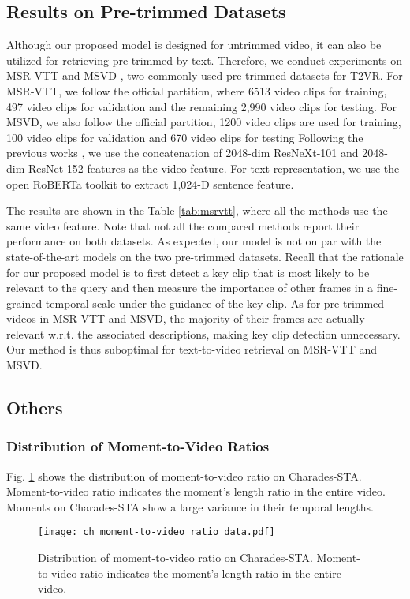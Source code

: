 \documentclass[sigconf]{acmart}
\begin{document}
\subsection{Results on Pre-trimmed Datasets}\label{sec:pre-trimmed}
Although our proposed model is designed for untrimmed video, it can also be utilized for retrieving pre-trimmed by text. Therefore, we conduct experiments on MSR-VTT \cite{xu2016msr} and MSVD \cite{chen2011collecting}, two commonly used pre-trimmed datasets for T2VR.
For MSR-VTT, we follow the official partition, where 6513 video clips for training, 497 video clips for validation and the remaining 2,990 video clips for testing. For MSVD, we also follow the official partition, 1200 video clips are used for training, 100 video clips for validation and 670 video clips for testing
Following the previous works \cite{dong2021dual,dong2022reading,li2019w2vv++}, we use the concatenation of 2048-dim ResNeXt-101 and 2048-dim ResNet-152 features as the video feature. For text representation, we use the open RoBERTa toolkit to extract 1,024-D sentence feature.  


The results are shown in the Table \ref{tab:msrvtt}, where all the methods use the same video feature. Note that not all the compared methods report their performance on both datasets. As expected, our model is not on par with the state-of-the-art models on the two pre-trimmed datasets. Recall that the rationale for our proposed model is to first detect a key clip that is most likely to be relevant to the query and then measure the importance of other frames in a fine-grained temporal scale under the guidance of the key clip. As for pre-trimmed videos in MSR-VTT and MSVD, the majority of their frames are actually relevant w.r.t. the associated descriptions, making key clip detection unnecessary. Our method is thus suboptimal for text-to-video retrieval on MSR-VTT and MSVD.





\subsection{Others}
\subsubsection{Distribution of Moment-to-Video Ratios}\label{sec:mvr}
Fig. \ref{fig:ratio_distribution_appendix} shows the distribution of moment-to-video ratio on Charades-STA. Moment-to-video ratio indicates the moment’s length ratio in the entire video.
Moments on Charades-STA show a large variance in their temporal lengths.
\begin{figure}[htb]
\texttt{[image: ch\_moment-to-video\_ratio\_data.pdf]}
\vspace{-3mm}
\caption{Distribution of moment-to-video ratio on Charades-STA. Moment-to-video ratio indicates the moment’s length ratio in the entire video.}\label{fig:ratio_distribution_appendix}
\vspace{-3mm}
\end{figure}
\end{document}
